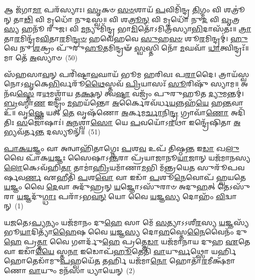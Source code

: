 𑌆 𑌜᳴𑌗𑌾\-\ul{𑌮𑌾} 𑌪𑌰᳴𑌸𑍍𑌯𑌾𑌃। \ul{𑌸𑍃}\-𑌕𑍞 \ul{𑌸}\-\-\ul{𑍞}\-𑌶𑌾𑌯᳴ \ul{𑌪}\-𑌵𑌿𑌮𑌿᳴𑌨𑍍𑌦𑍍𑌰 \ul{𑌤𑌿}\-𑌗𑍍𑌮𑌂 𑌵𑌿 𑌶𑌤𑍍𑌰𑍂॑𑌨𑍍 𑌤𑌾\-\ul{𑌢𑌿} 𑌵𑌿 𑌮𑍃𑌧𑍋᳴ 𑌨𑍁𑌦𑌸𑍍𑌵॥ 𑌵𑌿 𑌶\-\ul{𑌤𑍍𑌰𑍂}\-\-\ul{𑌨𑍍} 𑌵𑌿 𑌮𑍃𑌧𑍋᳴ 𑌨𑍁\-\ul{𑌦} 𑌵𑌿 \ul{𑌵𑍃}\-𑌤𑍍𑌰\-\ul{𑌸𑍍𑌯} 𑌹𑌨𑍂᳴ 𑌰𑍁𑌜। 𑌵𑌿 \ul{𑌮}\-𑌨𑍍𑌯𑍁𑌮𑌿᳴𑌨𑍍𑌦𑍍𑌰 𑌭𑌾\-\ul{𑌮𑌿}\-𑌤𑍋᳴\-𑌽𑌮𑌿𑌤𑍍𑌰᳴𑌸𑍍𑌯𑌾\-\ul{𑌭𑌿}\-𑌦𑌾𑌸᳴𑌤𑌃॥ \ul{𑌤𑍍𑌰𑌾}\-𑌤𑌾\-\ul{𑌰}\-𑌮𑌿𑌨𑍍𑌦𑍍𑌰᳴𑌮\-\ul{𑌵𑌿}\-𑌤𑌾\-\ul{𑌰}\-𑌮𑌿\-\ul{𑌨𑍍𑌦𑍍𑌰}\-\-\ul{𑍞} 𑌹𑌵𑍇᳴𑌹𑌵𑍇 \ul{𑌸𑍁}\-𑌹\-\ul{𑌵}\-\-\ul{𑍞} 𑌶𑍂\-\ul{𑌰}\-𑌮𑌿𑌨𑍍𑌦𑍍𑌰𑌮𑍍॑। \ul{𑌹𑍁}\-𑌵𑍇 𑌨𑍁 \ul{𑌶}\-𑌕𑍍𑌰𑌂 𑌪𑍁᳴𑌰𑍁\-\ul{𑌹𑍂}\-𑌤𑌮𑌿𑌨𑍍𑌦𑍍𑌰𑍟᳴ \ul{𑌸𑍍𑌵}\-𑌸𑍍𑌤𑌿 𑌨𑍋᳴ \ul{𑌮}\-𑌘𑌵𑌾᳴ \ul{𑌧𑌾}\-𑌤𑍍𑌵𑌿𑌨𑍍𑌦𑍍𑌰𑌃᳴॥ 𑌮𑌾 𑌤𑍇᳴ \ul{𑌅}\-𑌸𑍍𑌯𑌾𑍞~(50)

𑌸᳴𑌹𑌸𑌾\-\ul{𑌵}\-𑌨𑍍 𑌪𑌰𑌿᳴𑌷𑍍𑌟𑌾\-\ul{𑌵}\-𑌘𑌾𑌯᳴ 𑌭𑍂𑌮 𑌹𑌰𑌿𑌵𑌃 𑌪\-\ul{𑌰𑌾}\-𑌦𑍈। 𑌤𑍍𑌰𑌾𑌯᳴𑌸𑍍𑌵 𑌨𑍋\-𑌽\-\ul{𑌵𑍃}\-𑌕𑍇\-\ul{𑌭𑌿}\-𑌰𑍍𑌵𑌰𑍂᳴\-\ul{𑌥𑍈}\-𑌸𑍍𑌤𑌵᳴ \ul{𑌪𑍍𑌰𑌿}\-𑌯𑌾𑌸𑌃᳴ \ul{𑌸𑍂}\-𑌰𑌿𑌷𑍁᳴ 𑌸𑍍𑌯𑌾𑌮॥ 𑌅𑌨᳴𑌵\-\ul{𑌸𑍍𑌤𑍇} 𑌰\-\ul{𑌥}\-𑌮𑌶𑍍𑌵𑌾᳴𑌯 𑌤\-\ul{𑌕𑍍𑌷}\-𑌨𑍍 𑌤𑍍𑌵\-\ul{𑌷𑍍𑌟𑌾} 𑌵𑌜𑍍𑌰𑌂᳴ 𑌪𑍁𑌰𑍁𑌹𑍂𑌤 \ul{𑌦𑍍𑌯𑍁}\-𑌮𑌨𑍍𑌤𑌮𑍍॑। \ul{𑌬𑍍𑌰}\-𑌹𑍍𑌮𑌾\-\ul{𑌣} 𑌇𑌨𑍍𑌦𑍍𑌰𑌂᳴ \ul{𑌮}\-𑌹𑌯᳴𑌨𑍍𑌤𑍋 \ul{𑌅}\-𑌰𑍍𑌕𑍈𑌰𑌵᳴𑌰𑍍𑌧\-\ul{𑌯}\-𑌨𑍍𑌨𑌹᳴\-\ul{𑌯𑍇} 𑌹\-\ul{𑌨𑍍𑌤}\-𑌵𑌾 𑌉᳴॥ 𑌵𑍃\-\ul{𑌷𑍍𑌣𑍇} 𑌯𑌤𑍍 \ul{𑌤𑍇} 𑌵𑍃𑌷᳴𑌣𑍋 \ul{𑌅}\-𑌰𑍍𑌕𑌮\-\ul{𑌰𑍍𑌚𑌾}\-𑌨𑌿\-\ul{𑌨𑍍𑌦𑍍𑌰} 𑌗𑍍𑌰𑌾𑌵𑌾᳴\-\ul{𑌣𑍋} 𑌅𑌦𑌿᳴𑌤𑌿𑌃 \ul{𑌸}\-𑌜𑍋𑌷𑌾𑌃॑। \ul{𑌅}\-\-\ul{𑌨}\-𑌶𑍍𑌵𑌾\-\ul{𑌸𑍋} 𑌯𑍇 \ul{𑌪}\-𑌵𑌯𑍋᳴\-𑌽\-\ul{𑌰}\-𑌥𑌾 𑌇𑌨𑍍𑌦𑍍𑌰𑍇᳴𑌷𑌿𑌤𑌾 \ul{𑌅}\-𑌭𑍍𑌯𑌵᳴𑌰𑍍𑌤\-\ul{𑌨𑍍𑌤} 𑌦𑌸𑍍𑌯𑍂𑌨𑍍᳴॥~(51)

{\anuvakamend[{\-\ul{𑌵𑍃}\-\-\ul{𑌤𑍍𑌰}\-𑌹𑌤𑍍𑌯𑍇\-𑌽𑌨𑍁᳴ 𑌗𑌾\-\ul{𑌯}\-𑌤𑍍𑌰𑌿𑌣𑍋॑\-𑌽\-\ul{𑌧𑍍𑌵}\-𑌰𑌾𑌣𑌾𑌂॑ 𑌪\-\ul{𑌰𑌾}\-𑌵\-\ul{𑌤𑍋}\-\-𑌽𑌸𑍍𑌯𑌾\-\ul{𑌮}\-𑌷𑍍𑌟𑌾𑌚᳴𑌤𑍍𑌵𑌾𑌰𑌿𑍞𑌶𑌚𑍍𑌚}]}%

\setcounter{anuvakam}{0}
\-\ul{𑌪𑌾}\-\-\ul{𑌕}\-\-\ul{𑌯}\-𑌜𑍍𑌞𑌂 𑌵𑌾 𑌅𑌨𑍍𑌵𑌾𑌹𑌿᳴𑌤𑌾𑌗𑍍𑌨𑍇𑌃 \ul{𑌪}\-𑌶\-\ul{𑌵} 𑌉𑌪᳴ 𑌤𑌿𑌷𑍍𑌠\-\ul{𑌨𑍍𑌤} 𑌇\-\ul{𑌡𑌾} 𑌖\-\ul{𑌲𑍁} 𑌵𑍈 𑌪𑌾᳴𑌕\-\ul{𑌯}\-𑌜𑍍𑌞𑌃 𑌸𑍈𑌷𑌾𑌽\-\ul{𑌨𑍍𑌤}\-𑌰𑌾 𑌪𑍍𑌰᳴𑌯𑌾𑌜𑌾𑌨𑍂\-\ul{𑌯𑌾}\-𑌜𑌾𑌨𑍍 𑌯𑌜᳴𑌮𑌾𑌨𑌸𑍍𑌯 \ul{𑌲𑍋}\-𑌕𑍇\-𑌽𑌵᳴𑌹𑌿\-\ul{𑌤𑌾} 𑌤𑌾𑌮𑌾॑\-\ul{𑌹𑍍𑌰𑌿}\-𑌯𑌮𑌾᳴𑌣𑌾\-\ul{𑌮}\-𑌭𑌿 𑌮᳴𑌨𑍍𑌤𑍍𑌰𑌯𑍇\-\ul{𑌤} 𑌸𑍁𑌰𑍂᳴𑌪𑌵𑌰𑍍\mbox{}𑌷𑌵\-\ul{𑌰𑍍𑌣} 𑌏𑌹𑍀𑌤𑌿᳴ \ul{𑌪}\-𑌶\-\ul{𑌵𑍋} 𑌵𑌾 𑌇𑌡𑌾᳴ \ul{𑌪}\-𑌶𑍂\-\ul{𑌨𑍇}\-𑌵𑍋𑌪᳴ 𑌹𑍍𑌵𑌯𑌤𑍇 \ul{𑌯}\-𑌜𑍍𑌞𑌂 𑌵𑍈 \ul{𑌦𑍇}\-𑌵𑌾 𑌅𑌦𑍁᳴𑌹𑍍𑌰𑌨𑍍 \ul{𑌯}\-𑌜𑍍𑌞𑍋\-𑌽𑌸𑍁᳴𑌰𑌾𑍞 𑌅𑌦𑍁\-\ul{𑌹}\-𑌤𑍍 𑌤𑍇\-𑌽𑌸𑍁᳴𑌰𑌾 \ul{𑌯}\-𑌜𑍍𑌞𑌦𑍁᳴\-\ul{𑌗𑍍𑌧𑌾𑌃} 𑌪𑌰𑌾᳴\-𑌽𑌭\-\ul{𑌵}\-\-\ul{𑌨𑍍} 𑌯𑍋 𑌵𑍈 \ul{𑌯}\-𑌜𑍍𑌞\-\ul{𑌸𑍍𑌯} 𑌦𑍋𑌹𑌂᳴ \ul{𑌵𑌿}\-𑌦𑍍𑌵𑌾𑌨𑍍~(1)

𑌯\-\ul{𑌜}\-𑌤𑍇\-𑌽\-\ul{𑌪𑍍𑌯}\-𑌨𑍍𑌯𑌂 𑌯𑌜᳴𑌮𑌾𑌨𑌂 𑌦𑍁\-\ul{𑌹𑍇} 𑌸𑌾 𑌮𑍇᳴ \ul{𑌸}\-𑌤𑍍𑌯𑌾\-𑌽\-𑌽𑌶𑍀\-\ul{𑌰}\-𑌸𑍍𑌯 \ul{𑌯}\-𑌜𑍍𑌞𑌸𑍍𑌯᳴ 𑌭𑍂\-\ul{𑌯𑌾}\-𑌦𑌿𑌤𑍍𑌯𑌾᳴\-\ul{𑌹𑍈}\-𑌷 𑌵𑍈 \ul{𑌯}\-𑌜𑍍𑌞\-\ul{𑌸𑍍𑌯} 𑌦𑍋\-\ul{𑌹}\-𑌸𑍍𑌤𑍇\-\ul{𑌨𑍈}\-𑌵𑍈𑌨𑌂᳴ 𑌦𑍁\-\ul{𑌹𑍇} 𑌪𑍍𑌰\-\ul{𑌤𑍍𑌤𑌾} 𑌵𑍈 𑌗𑍗𑌰𑍍𑌦𑍁᳴\-\ul{𑌹𑍇} 𑌪𑍍𑌰𑌤𑍍𑌤𑍇\-\ul{𑌡𑌾} 𑌯𑌜᳴𑌮𑌾𑌨𑌾𑌯 𑌦𑍁𑌹 \ul{𑌏}\-𑌤𑍇 𑌵𑌾 𑌇𑌡𑌾᳴\-\ul{𑌯𑍈} 𑌸𑍍𑌤\-\ul{𑌨𑌾} 𑌇𑌡𑍋𑌪᳴\-\ul{𑌹𑍂}\-𑌤𑍇𑌤𑌿᳴ \ul{𑌵𑌾}\-𑌯𑍁\-\ul{𑌰𑍍𑌵}\-𑌥𑍍𑌸𑍋 𑌯𑌰𑍍\mbox{}\-\ul{𑌹𑌿} 𑌹𑍋𑌤𑍇𑌡𑌾᳴𑌮𑍁\-\ul{𑌪}\-𑌹𑍍𑌵𑌯𑍇᳴\-\ul{𑌤} 𑌤𑌰𑍍\mbox{}\-\ul{𑌹𑌿} 𑌯𑌜᳴𑌮𑌾\-\ul{𑌨𑍋} 𑌹𑍋𑌤𑌾᳴\-\ul{𑌰}\-𑌮𑍀𑌕𑍍𑌷᳴𑌮𑌾𑌣𑍋 \ul{𑌵𑌾}\-𑌯𑍁𑌂 𑌮𑌨᳴𑌸𑌾 𑌧𑍍𑌯𑌾𑌯𑍇𑌨𑍍~(2)

